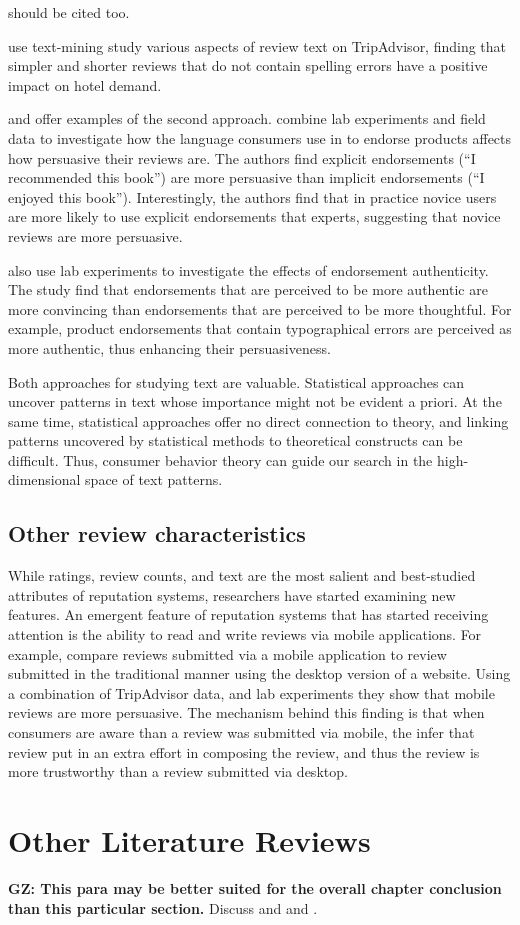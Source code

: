 \documentclass[letter,12pt]{article}
\begin{document}
\citet{ghose2011estimating} should be cited too.

\citet{ghose2012designing} use text-mining study various aspects of review
text on TripAdvisor, finding that simpler and shorter reviews that do not
contain spelling errors have a positive impact on hotel demand.

\cite{packard2017language} and \cite{kupor2017spontaneous} offer examples of
the second approach. \citet{packard2017language} combine lab experiments and
field data to investigate how the language consumers use in to endorse
products affects how persuasive their reviews are. The authors find explicit
endorsements (``I recommended this book'') are more persuasive than implicit
endorsements (``I enjoyed this book''). Interestingly, the authors find that
in practice novice users are more likely to use explicit endorsements that
experts, suggesting that novice reviews are more persuasive.

\citet{kupor2017spontaneous} also use lab experiments to investigate the
effects of endorsement authenticity. The study find that endorsements that are
perceived to be more authentic are more convincing than endorsements that are
perceived to be more thoughtful. For example, product endorsements that
contain typographical errors are perceived as more authentic, thus enhancing
their persuasiveness.

Both approaches for studying text are valuable. Statistical approaches can
uncover patterns in text whose importance might not be evident a priori. At
the same time, statistical approaches offer no direct connection to theory,
and linking patterns uncovered by statistical methods to theoretical
constructs can be difficult. Thus, consumer behavior theory can guide our
search in the high-dimensional space of text patterns.

\subsection{Other review characteristics}

While ratings, review counts, and text are the most salient and best-studied
attributes of reputation systems, researchers have started examining new
features. An emergent feature of reputation systems that has started receiving
attention is the ability to read and write reviews via mobile applications.
For example, \citet{grewal2016mobile} compare reviews submitted via a mobile
application to review submitted in the traditional manner using the desktop
version of a website. Using a combination of TripAdvisor data, and lab
experiments they show that mobile reviews are more persuasive. The mechanism
behind this finding is that when consumers are aware than a review was
submitted via mobile, the infer that review put in an extra effort in
composing the review, and thus the review is more trustworthy than a review
submitted via desktop.

\section{Other Literature Reviews}

\textbf{GZ: This para may be better suited for the overall chapter conclusion
than this particular section.} Discuss \citet{dellarocas2003digitization} and
\citet{luca2015user} and \citet{berger2014word}.

\printbibliography
\end{document}
